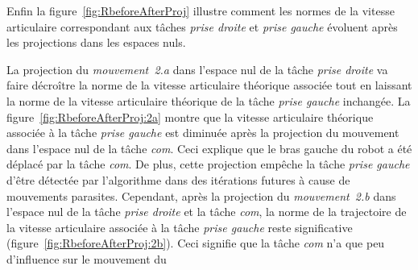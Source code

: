 Enfin la figure~\ref{fig:RbeforeAfterProj} illustre comment les normes de la vitesse articulaire
correspondant aux t\^aches \emph{prise droite} et \emph{prise gauche} évoluent
après les projections dans les espaces nuls. 
\begin{figure*}[p]
\centering
  \subfigure[Mouvement 2.a]{
  \resizebox{.47\textwidth}{!} {
      
    }
  \label{fig:RbeforeAfterProj:2a}
  }
  \subfigure[Mouvement 2.b]{
  \resizebox{.47\textwidth}{!} {
      
  }
  \label{fig:RbeforeAfterProj:2b}
  }
  \caption[Evolution de la trajectoire $\dot{\mbf{q}}$.]{Evolution de la trajectoire $\dot{\mbf{q}}$ projetée dans les espaces des t\^aches
  \emph{prise droite} (en ligne pleine) et 
  \emph{prise gauche} (en pointillés) après les projections successives du mouvement dans l'espace
  nul des t\^aches \emph{prise droite} et l'espace nul de la t\^ache \emph{com}.
  Dans le \emph{mouvement~2.a}, une grande partie du mouvement du bras gauche
  est dû à la t\^ache \emph{com}: la suppression de la t\^ache \emph{com} va annuler presque tout
  le mouvement du bras gauche.
  Dans le \emph{mouvement~2.b}, le mouvement du bras gauche n'est pas seulement issu de
  la t\^ache \emph{com}, mais principalement de la t\^ache \emph{prise gauche}.
  La suppression de la t\^ache \emph{com} va seulement annuler une petite partie
  du mouvement du bras gauche.}
\label{fig:RbeforeAfterProj}
\end{figure*}
La projection du \emph{mouvement~2.a} dans l'espace nul de la t\^ache
\emph{prise droite} va faire décroître la norme de la vitesse articulaire théorique
associée tout en laissant la norme de la vitesse articulaire théorique de la t\^ache
\emph{prise gauche} inchangée. La figure~\ref{fig:RbeforeAfterProj:2a} montre
que la vitesse articulaire théorique associée à la t\^ache \emph{prise gauche}
est diminuée après la projection du mouvement dans l'espace nul de la t\^ache \emph{com}.
Ceci explique que le bras gauche du robot a été déplacé par la t\^ache \emph{com}.
De plus, cette projection empêche la t\^ache \emph{prise gauche} d'être détectée par l'algorithme
dans des itérations futures à cause de mouvements parasites.
Cependant, après la projection du \emph{mouvement~2.b} dans l'espace nul de la t\^ache \emph{prise droite}
et la t\^ache \emph{com}, la norme de la trajectoire de la vitesse articulaire associée à la t\^ache
\emph{prise gauche} reste significative (figure~\ref{fig:RbeforeAfterProj:2b}). 
Ceci signifie que la t\^ache \emph{com} n'a que peu d'influence sur le mouvement du
